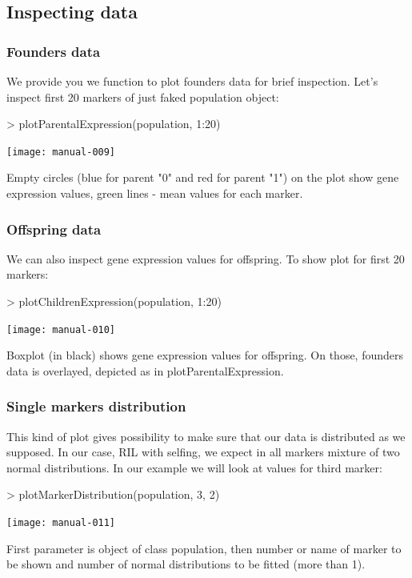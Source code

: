 \documentclass{article}
\begin{document}
\subsection{Inspecting data}
\subsubsection{Founders data}
We provide you we function to plot founders data for brief inspection. Let's inspect first 20 markers of just faked population object:

\begin{Schunk}
\begin{Sinput}
> plotParentalExpression(population, 1:20)
\end{Sinput}
\end{Schunk}
\texttt{[image: manual-009]}

{\noindent}Empty circles (blue for parent "0" and red for parent "1") on the plot show gene expression values, green lines - mean values for each marker.
\newpage
\subsubsection{Offspring data}
We can also inspect gene expression values for offspring. To show plot for first 20 markers:
\begin{Schunk}
\begin{Sinput}
> plotChildrenExpression(population, 1:20)
\end{Sinput}
\end{Schunk}
\texttt{[image: manual-010]}

{\noindent}Boxplot (in black) shows gene expression values for offspring. On those, founders data is overlayed, depicted as in plotParentalExpression.
\newpage
\subsubsection{Single markers distribution}
This kind of plot gives possibility to make sure that our data is distributed as we supposed. In our case, RIL with selfing, we expect in all markers mixture of two normal distributions.
In our example we will look at values for third marker:
\begin{Schunk}
\begin{Sinput}
> plotMarkerDistribution(population, 3, 2)
\end{Sinput}
\end{Schunk}
\texttt{[image: manual-011]}

{\noindent}First parameter is object of class population, then number or name of marker to be shown and number of normal distributions to be fitted (more than 1).
\newpage
\end{document}
